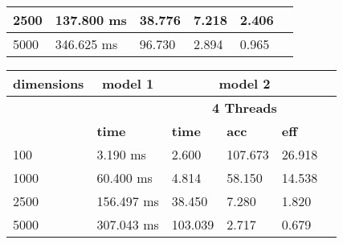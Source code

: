 \documentclass{article}
\begin{document}
\begin{table}
\begin{tabular}{|l|l|l|l|l|l|}
2500
 & 137.800 ms & 38.776 & 7.218 & 2.406\\ \hline
5000
 & 346.625 ms & 96.730 & 2.894 & 0.965\\ \hline
\end{tabular}
\end{table}\begin{table}
\begin{tabular}{|l|l|l|l|l|l|}\hline
\multicolumn{1}{|c|}{\textbf{dimensions}} &\multicolumn{1}{|c|}{\textbf{model 1}} &\multicolumn{3}{|c|}{\textbf{model 2}}\\ \hline
& & \multicolumn{3}{c|}{\textbf{4 Threads}} \\ \hline
& \textbf{time} & \textbf{time} & \textbf{acc} & \textbf{eff}\\ \hline
100
 & 3.190 ms & 2.600 & 107.673 & 26.918\\ \hline
1000
 & 60.400 ms & 4.814 & 58.150 & 14.538\\ \hline
2500
 & 156.497 ms & 38.450 & 7.280 & 1.820\\ \hline
5000
 & 307.043 ms & 103.039 & 2.717 & 0.679\\ \hline
\end{tabular}
\end{table}
\end{document}
